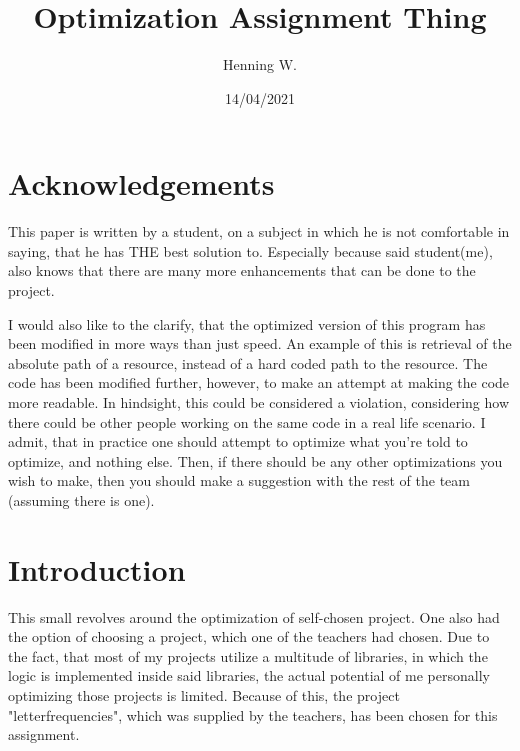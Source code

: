 \documentclass[a4paper, 12pt]{report}
\begin{document}
\title{\Large{\textbf{Optimization Assignment Thing}}}
\author{Henning W.}
\date{14/04/2021}
\maketitle
\tableofcontents
\setcounter{page}{2}
\fancyhf{}
\renewcommand{\headrulewidth}{2pt}
\renewcommand{\headrulewidth}{2pt}
\pagestyle{fancy} %
\fancyhf{} %
\fancyfoot[R]{\thepage}

\fancypagestyle{plain}{%
    \renewcommand{\headrulewidth}{0pt}%
    \fancyhf{}%
    \fancyfoot[R]{\thepage}%
}

\chapter{Acknowledgements}
This paper is written by a student, on a subject in which he is not comfortable in saying, that he has THE best solution to. Especially because said student(me), also knows that there are many more enhancements that can be done to the project.

I would also like to the clarify, that the optimized version of this program has been modified in more ways than just speed. An example of this is retrieval of the absolute path of a resource, instead of a hard coded path to the resource. The code has been modified further, however, to make an attempt at making the code more readable. In hindsight, this could be considered a violation, considering how there could be other people working on the same code in a real life scenario. I admit, that in practice one should attempt to optimize what you're told to optimize, and nothing else. Then, if there should be any other optimizations you wish to make, then you should make a suggestion with the rest of the team (assuming there is one).

\chapter{Introduction}

This small revolves around the optimization of self-chosen project. One also had the option of choosing a project, which one of the teachers had chosen. Due to the fact, that most of my projects utilize a multitude of libraries, in which the logic is implemented inside said libraries, the actual potential of me personally optimizing those projects is limited. Because of this, the project "letterfrequencies", which was supplied by the teachers, has been chosen for this assignment.
\end{document}
